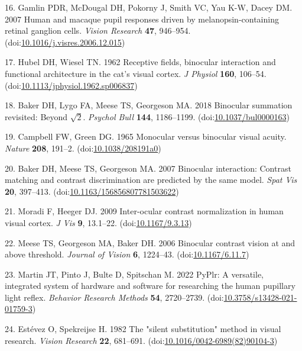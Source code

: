\documentclass[
]{article}
\begin{document}
\leavevmode\hypertarget{ref-Gamlin2007}{}%
16. Gamlin PDR, McDougal DH, Pokorny J, Smith VC, Yau K-W, Dacey DM. 2007 Human and macaque pupil responses driven by melanopsin-containing retinal ganglion cells. \emph{Vision Research} \textbf{47}, 946--954. (doi:\href{https://doi.org/10.1016/j.visres.2006.12.015}{10.1016/j.visres.2006.12.015})

\leavevmode\hypertarget{ref-Hubel1962}{}%
17. Hubel DH, Wiesel TN. 1962 Receptive fields, binocular interaction and functional architecture in the cat's visual cortex. \emph{J Physiol} \textbf{160}, 106--54. (doi:\href{https://doi.org/10.1113/jphysiol.1962.sp006837}{10.1113/jphysiol.1962.sp006837})

\leavevmode\hypertarget{ref-Baker2018}{}%
18. Baker DH, Lygo FA, Meese TS, Georgeson MA. 2018 Binocular summation revisited: Beyond \(\sqrt{2}\). \emph{Psychol Bull} \textbf{144}, 1186--1199. (doi:\href{https://doi.org/10.1037/bul0000163}{10.1037/bul0000163})

\leavevmode\hypertarget{ref-Campbell1965}{}%
19. Campbell FW, Green DG. 1965 Monocular versus binocular visual acuity. \emph{Nature} \textbf{208}, 191--2. (doi:\href{https://doi.org/10.1038/208191a0}{10.1038/208191a0})

\leavevmode\hypertarget{ref-Baker2007}{}%
20. Baker DH, Meese TS, Georgeson MA. 2007 Binocular interaction: Contrast matching and contrast discrimination are predicted by the same model. \emph{Spat Vis} \textbf{20}, 397--413. (doi:\href{https://doi.org/10.1163/156856807781503622}{10.1163/156856807781503622})

\leavevmode\hypertarget{ref-Moradi2009}{}%
21. Moradi F, Heeger DJ. 2009 Inter-ocular contrast normalization in human visual cortex. \emph{J Vis} \textbf{9}, 13.1--22. (doi:\href{https://doi.org/10.1167/9.3.13}{10.1167/9.3.13})

\leavevmode\hypertarget{ref-Meese2006}{}%
22. Meese TS, Georgeson MA, Baker DH. 2006 Binocular contrast vision at and above threshold. \emph{Journal of Vision} \textbf{6}, 1224--43. (doi:\href{https://doi.org/10.1167/6.11.7}{10.1167/6.11.7})

\leavevmode\hypertarget{ref-Martin2022}{}%
23. Martin JT, Pinto J, Bulte D, Spitschan M. 2022 PyPlr: A versatile, integrated system of hardware and software for researching the human pupillary light reflex. \emph{Behavior Research Methods} \textbf{54}, 2720--2739. (doi:\href{https://doi.org/10.3758/s13428-021-01759-3}{10.3758/s13428-021-01759-3})

\leavevmode\hypertarget{ref-Estevez1982}{}%
24. Estévez O, Spekreijse H. 1982 The "silent substitution" method in visual research. \emph{Vision Research} \textbf{22}, 681--691. (doi:\href{https://doi.org/10.1016/0042-6989(82)90104-3}{10.1016/0042-6989(82)90104-3})
\end{document}
